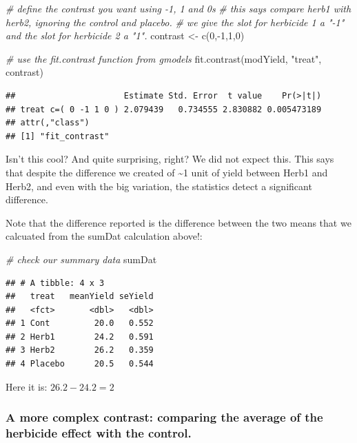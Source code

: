 \documentclass[
]{book}
\newenvironment{Shaded}{\begin{snugshade}}{\end{snugshade}}
\newcommand{\CommentTok}[1]{\textcolor[rgb]{0.56,0.35,0.01}{\textit{#1}}}
\newcommand{\DecValTok}[1]{\textcolor[rgb]{0.00,0.00,0.81}{#1}}
\newcommand{\FunctionTok}[1]{\textcolor[rgb]{0.00,0.00,0.00}{#1}}
\newcommand{\NormalTok}[1]{#1}
\newcommand{\OtherTok}[1]{\textcolor[rgb]{0.56,0.35,0.01}{#1}}
\newcommand{\SpecialCharTok}[1]{\textcolor[rgb]{0.00,0.00,0.00}{#1}}
\newcommand{\StringTok}[1]{\textcolor[rgb]{0.31,0.60,0.02}{#1}}
\begin{document}
\begin{Shaded}
\begin{Highlighting}[]
\CommentTok{\# define the contrast you want using {-}1, 1 and 0\textquotesingle{}s}
\CommentTok{\# this says compare herb1 with herb2, ignoring the control and placebo.}
\CommentTok{\# we give the slot for herbicide 1 a "{-}1" and the slot for herbicide 2 a "1".}
\NormalTok{contrast }\OtherTok{\textless{}{-}} \FunctionTok{c}\NormalTok{(}\DecValTok{0}\NormalTok{,}\SpecialCharTok{{-}}\DecValTok{1}\NormalTok{,}\DecValTok{1}\NormalTok{,}\DecValTok{0}\NormalTok{)}

\CommentTok{\# use the fit.contrast function from gmodels}
\FunctionTok{fit.contrast}\NormalTok{(modYield, }\StringTok{"treat"}\NormalTok{, contrast)}
\end{Highlighting}
\end{Shaded}

\begin{verbatim}
##                      Estimate Std. Error  t value    Pr(>|t|)
## treat c=( 0 -1 1 0 ) 2.079439   0.734555 2.830882 0.005473189
## attr(,"class")
## [1] "fit_contrast"
\end{verbatim}

Isn't this cool? And quite surprising, right? We did not expect this. This says that despite the difference we created of \textasciitilde1 unit of yield between Herb1 and Herb2, and even with the big variation, the statistics detect a significant difference.

Note that the difference reported is the difference between the two means that we calcuated from the sumDat calculation above!:

\begin{Shaded}
\begin{Highlighting}[]
\CommentTok{\# check our summary data}
\NormalTok{sumDat}
\end{Highlighting}
\end{Shaded}

\begin{verbatim}
## # A tibble: 4 x 3
##   treat   meanYield seYield
##   <fct>       <dbl>   <dbl>
## 1 Cont         20.0   0.552
## 2 Herb1        24.2   0.591
## 3 Herb2        26.2   0.359
## 4 Placebo      20.5   0.544
\end{verbatim}

Here it is: \(26.2 - 24.2 = 2\)

\hypertarget{a-more-complex-contrast-comparing-the-average-of-the-herbicide-effect-with-the-control.}{%
\subsubsection{A more complex contrast: comparing the average of the herbicide effect with the control.}\label{a-more-complex-contrast-comparing-the-average-of-the-herbicide-effect-with-the-control.}}
\end{document}
